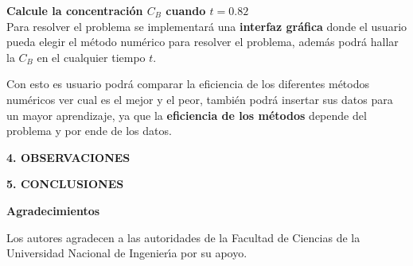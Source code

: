 \documentclass[10pt,a4paper]{article}
\begin{document}
\begin{multicols}{2}
\textbf{Calcule la concentración $C_B$ cuando $t = 0.82$}\\

		
\noindent Para resolver el problema se implementará una \textbf{interfaz gráfica} donde el usuario pueda elegir el método numérico para resolver el problema, además podrá hallar la $C_B$ en el cualquier tiempo $t$.  

\noindent Con esto es usuario podrá comparar la eficiencia de los diferentes métodos numéricos ver cual es el mejor y el peor, también podrá insertar sus datos para un mayor aprendizaje, ya que la \textbf{eficiencia de los métodos} depende del problema y por ende de los datos.

\begin{center}
{\large \bf 4. OBSERVACIONES}
\end{center}

\begin{center}
{\large \bf 5. CONCLUSIONES}
\end{center}

\begin{center}
{\large \bf Agradecimientos}
\end{center}
Los autores agradecen a las autoridades de la Facultad de Ciencias de la Universidad Nacional de 
Ingenier\'{\i}a por su apoyo.

\end{multicols}
\newpage
\end{document}
